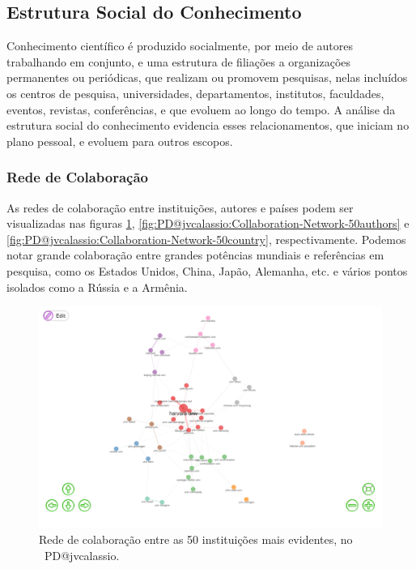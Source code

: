 \subsection{Estrutura Social do Conhecimento}

Conhecimento científico é produzido socialmente, por meio de autores trabalhando em conjunto, e uma estrutura de filiações a organizações permanentes ou periódicas, que realizam ou promovem pesquisas, nelas incluídos os centros de pesquisa, universidades, departamentos, institutos, faculdades, eventos, revistas, conferências, e que evoluem ao longo do tempo. A análise da estrutura social do conhecimento evidencia esses relacionamentos, que iniciam no plano pessoal, e evoluem para outros escopos.

\subsubsection{Rede de Colaboração}

As redes de colaboração entre instituições, autores e países podem ser visualizadas nas figuras \ref{fig:PD@jvcalassio:Collaboration-Network-50instit}, \ref{fig:PD@jvcalassio:Collaboration-Network-50authors} e \ref{fig:PD@jvcalassio:Collaboration-Network-50country}, respectivamente. Podemos notar grande colaboração entre grandes potências mundiais e referências em pesquisa, como os Estados Unidos, China, Japão, Alemanha, etc. e vários pontos isolados como a Rússia e a Armênia.

\begin{figure}
    \centering
    \includegraphics[width=1\textwidth]{exploratory-data-analysis/jvcalassio/PesqBibliogr/PrisonersDilemma/WoS-20221201/Dataset/Collaboration-Network-Institutions-2022-12-03.png}
    \caption{Rede de colaboração entre as 50 instituições mais evidentes, no  \dataset\ PD@jvcalassio.}
    \label{fig:PD@jvcalassio:Collaboration-Network-50instit}
\end{figure}


